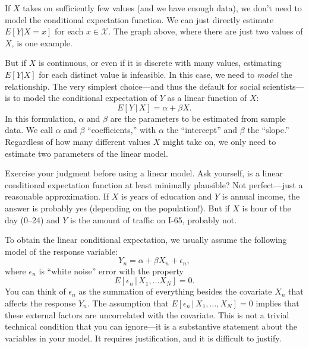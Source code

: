 \documentclass[
  12pt,
  oneside,openany]{book}
\begin{document}
If \(X\) takes on sufficiently few values (and we have enough data), we don't need to model the conditional expectation function. We can just directly estimate \(E[Y | X = x]\) for each \(x \in \mathcal{X}\). The graph above, where there are just two values of \(X\), is one example.

But if \(X\) is continuous, or even if it is discrete with many values, estimating \(E[Y | X]\) for each distinct value is infeasible. In this case, we need to \emph{model} the relationship. The very simplest choice---and thus the default for social scientists---is to model the conditional expectation of \(Y\) as a linear function of \(X\):
\begin{equation}
E[Y \,|\, X] = \alpha + \beta X.
\end{equation}
In this formulation, \(\alpha\) and \(\beta\) are the parameters to be estimated from sample data. We call \(\alpha\) and \(\beta\) ``coefficients,'' with \(\alpha\) the ``intercept'' and \(\beta\) the ``slope.'' Regardless of how many different values \(X\) might take on, we only need to estimate two parameters of the linear model.

Exercise your judgment before using a linear model. Ask yourself, is a linear conditional expectation function at least minimally plausible? Not perfect---just a reasonable approximation. If \(X\) is years of education and \(Y\) is annual income, the answer is probably yes (depending on the population!). But if \(X\) is hour of the day (0--24) and \(Y\) is the amount of traffic on I-65, probably not.

To obtain the linear conditional expectation, we usually assume the following model of the response variable:
\begin{equation}
Y_n = \alpha + \beta X_n + \epsilon_n,
\end{equation}
where \(\epsilon_n\) is ``white noise'' error with the property
\begin{equation}
E[\epsilon_n \,|\, X_1, \ldots X_N] = 0.
\end{equation}
You can think of \(\epsilon_n\) as the summation of everything besides the covariate \(X_n\) that affects the response \(Y_n\). The assumption that \(E[\epsilon_n \,|\, X_1, \ldots, X_N] = 0\) implies that these external factors are uncorrelated with the covariate. This is not a trivial technical condition that you can ignore---it is a substantive statement about the variables in your model. It requires justification, and it is difficult to justify.
\end{document}
